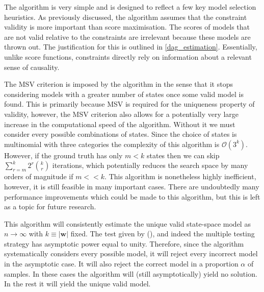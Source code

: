 \documentclass{article}
\begin{document}
The algorithm is very simple and is designed to reflect a few key model selection heuristics. As previously discussed, the algorithm assumes that the constraint validity is more important than score maximisation. The scores of models that are not valid relative to the constraints are irrelevant because these models are thrown out. The justification for this is outlined in \ref{dag_estimation}. Essentially, unlike score functions, constraints directly rely on information about a relevant sense of causality.

The MSV criterion is imposed by the algorithm in the sense that it stops considering models with a greater number of states once some valid model is found. This is primarily because MSV is required for the uniqueness property of validity, however, the MSV criterion also allows for a potentially very large increase in the computational speed of the algorithm. Without it we must consider every possible combinations of states. Since the choice of states is multinomial with three categories the complexity of this algorithm is $\mathcal{O}(3^k)$. However, if the ground truth has only $m < k$ states then we can skip $\sum_{r=m}^{k} 2^r {\binom{k}{r}}$ iterations, which potentially reduces the search space by many orders of magnitude if $m << k$. This algorithm is nonetheless highly inefficient, however, it is still feasible in many important cases. There are undoubtedly many performance improvements which could be made to this algorithm, but this is left as a topic for future research.

This algorithm will consistently estimate the unique valid state-space model as $n \rightarrow \infty$ with $k \equiv |\mathbf{w}|$ fixed. The test given by \citeauthor{srivastava2005some} (\citeyear{srivastava2005some}), and indeed the multiple testing strategy has asymptotic power equal to unity. Therefore, since the algorithm systematically considers every possible model, it will reject every incorrect model in the asymptotic case. It will also reject the correct model in a proportion $\alpha$ of samples. In these cases the algorithm will (still asymptotically) yield no solution. In the rest it will yield the unique valid model. 
\end{document}
